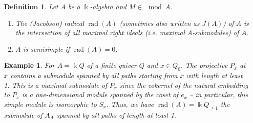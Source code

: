 \documentclass[11pt,a4paper]{article}
\numberwithin{equation}{section}
\theoremstyle{all}
\newtheorem{example}[theorem]{Example}
\newtheorem{definition}[theorem]{Definition}
\theoremstyle{remark}
\newcommand{\rad}{\operatorname{rad}\nolimits}
\newcommand{\defn}[1]{\textsl{\color{darkblue} #1}}
\begin{document}
\begin{definition}
Let $A$ be a $\Bbbk$-algebra and $M\in \mod A$.
\begin{enumerate}
\item The \defn{(Jacobson) radical} $\rad(A)$ (sometimes also written as $J(A)$) of $A$ is the intersection of all maximal right ideals (i.e. maximal $A$-submodules) of $A$.

\item $A$ is \defn{semisimple} if $\rad(A)=0$.
\end{enumerate}
\end{definition}

\begin{example}
For $A=\Bbbk Q$ of a finite quiver $Q$ and $x\in Q_0$.
The projective $P_x$ at $x$ contains a submodule spanned by all paths starting from $x$ with length at least 1.
This is a maximal submodule of $P_x$ since the cokernel of the natural embedding to $P_x$ is a one-dimensional module spanned by the coset of $e_x$ -- in particular, this simple module is isomorphic to $S_x$.
Thus, we have $\rad(A)=\Bbbk Q_{\geq 1}$ the submodule of $A_A$ spanned by all paths of length at least 1.
\end{example}

%
\end{document}
